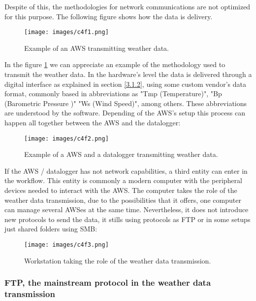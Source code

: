 Despite of this, the methodologies for network communications are not optimized for this purpose. The following figure shows how the data is delivery.

\begin{figure}[h!]
\centerline{\texttt{[image: images/c4f1.png]}}
\caption{Example of an \protect \gls{AWS} transmitting weather data.}
\label{f4.2}
\end{figure}

In the figure \ref{f4.2} we can appreciate an example of the methodology used to transmit the weather data. In the hardware's level the data is delivered through a digital interface as explained in section \ref{3.1.2}, using some custom vendor's data format, commonly based in abbreviations as "Tmp (Temperature)", "Bp (Barometric Pressure )" "Ws (Wind Speed)", among others. These abbreviations are understood by the software. Depending of the AWS's setup this process can happen all together between the AWS and the datalogger:

\begin{figure}[h]
\centerline{\texttt{[image: images/c4f2.png]}}
\caption{Example of a \protect \gls{AWS} and a datalogger transmitting weather data.}
\end{figure}

If the \gls{AWS} / datalogger has not network capabilities, a third entity can enter in the workflow. This entity is commonly a modern computer with the peripheral devices needed to interact with the \gls{AWS}. The computer takes the role of the weather data transmission, due to the possibilities that it offers, one computer can manage several \gls{AWS}es at the same time. Nevertheless, it does not introduce new protocols to send the data, it stills using protocols as \gls{FTP} or in some setups just shared folders using \gls{SMB}:


\begin{figure}[h!]
\centerline{\texttt{[image: images/c4f3.png]}}
\caption{Workstation taking the role of the weather data transmission.}
\end{figure}


\subsubsection{FTP, the mainstream protocol in the weather data transmission}

